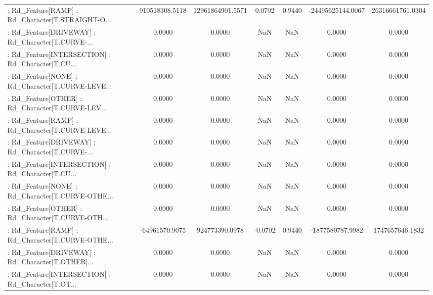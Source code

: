 \begin{longtable}{p{4cm}cccccc}
 : Rd\_Feature[RAMP] : Rd\_Character[T.STRAIGHT-O... &    910518308.5118 &  12961864901.5571 &  0.0702 &       0.9440 &  -24495625144.0067 &  26316661761.0304 \\
 : Rd\_Feature[DRIVEWAY] : Rd\_Character[T.CURVE-... &            0.0000 &            0.0000 &     NaN &          NaN &             0.0000 &            0.0000 \\
 : Rd\_Feature[INTERSECTION] : Rd\_Character[T.CU... &            0.0000 &            0.0000 &     NaN &          NaN &             0.0000 &            0.0000 \\
 : Rd\_Feature[NONE] : Rd\_Character[T.CURVE-LEVE... &            0.0000 &            0.0000 &     NaN &          NaN &             0.0000 &            0.0000 \\
 : Rd\_Feature[OTHER] : Rd\_Character[T.CURVE-LEV... &            0.0000 &            0.0000 &     NaN &          NaN &             0.0000 &            0.0000 \\
 : Rd\_Feature[RAMP] : Rd\_Character[T.CURVE-LEVE... &            0.0000 &            0.0000 &     NaN &          NaN &             0.0000 &            0.0000 \\
 : Rd\_Feature[DRIVEWAY] : Rd\_Character[T.CURVE-... &            0.0000 &            0.0000 &     NaN &          NaN &             0.0000 &            0.0000 \\
 : Rd\_Feature[INTERSECTION] : Rd\_Character[T.CU... &            0.0000 &            0.0000 &     NaN &          NaN &             0.0000 &            0.0000 \\
 : Rd\_Feature[NONE] : Rd\_Character[T.CURVE-OTHE... &            0.0000 &            0.0000 &     NaN &          NaN &             0.0000 &            0.0000 \\
 : Rd\_Feature[OTHER] : Rd\_Character[T.CURVE-OTH... &            0.0000 &            0.0000 &     NaN &          NaN &             0.0000 &            0.0000 \\
 : Rd\_Feature[RAMP] : Rd\_Character[T.CURVE-OTHE... &    -64961570.9075 &    924773390.0978 & -0.0702 &       0.9440 &   -1877580787.9982 &   1747657646.1832 \\
 : Rd\_Feature[DRIVEWAY] : Rd\_Character[T.OTHER]... &            0.0000 &            0.0000 &     NaN &          NaN &             0.0000 &            0.0000 \\
 : Rd\_Feature[INTERSECTION] : Rd\_Character[T.OT... &            0.0000 &            0.0000 &     NaN &          NaN &             0.0000 &            0.0000 \\

\end{longtable}
